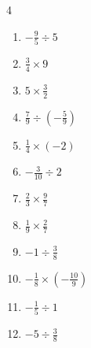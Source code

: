 \begin{multicols}{4}
\begin{enumerate}

  \item $\displaystyle -\frac{9}{5}\div{}5$


  \item $\displaystyle \frac{3}{4}\times{}9$


  \item $\displaystyle 5\times{}\frac{3}{2}$


  \item $\displaystyle \frac{7}{9}\div{}\left(-\frac{5}{9}\right)$


  \item $\displaystyle \frac{1}{4}\times{}\left(-2\right)$


  \item $\displaystyle -\frac{3}{10}\div{}2$


  \item $\displaystyle \frac{2}{3}\times{}\frac{9}{7}$


  \item $\displaystyle \frac{1}{9}\times{}\frac{2}{7}$


\columnbreak %

  \item $\displaystyle -1\div{}\frac{3}{8}$


  \item $\displaystyle -\frac{1}{8}\times{}\left(-\frac{10}{9}\right)$


  \item $\displaystyle -\frac{1}{5}\div{}1$


  \item $\displaystyle -5\div{}\frac{3}{8}$


\end{enumerate}
\end{multicols}
